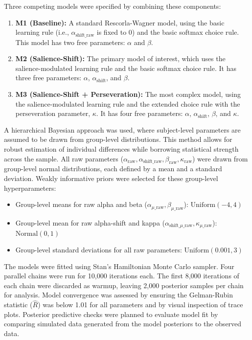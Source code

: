 Three competing models were specified by combining these components:
\begin{enumerate}
    \item \textbf{M1 (Baseline):} A standard Rescorla-Wagner model, using the basic learning rule (i.e., $\alpha_{\text{shift\_raw}}$ is fixed to 0) and the basic softmax choice rule. This model has two free parameters: $\alpha$ and $\beta$.
    \item \textbf{M2 (Salience-Shift):} The primary model of interest, which uses the salience-modulated learning rule and the basic softmax choice rule. It has three free parameters: $\alpha$, $\alpha_{\text{shift}}$, and $\beta$.
    \item \textbf{M3 (Salience-Shift + Perseveration):} The most complex model, using the salience-modulated learning rule and the extended choice rule with the perseveration parameter, $\kappa$. It has four free parameters: $\alpha$, $\alpha_{\text{shift}}$, $\beta$, and $\kappa$.
\end{enumerate}

A hierarchical Bayesian approach was used, where subject-level parameters are assumed to be drawn from group-level distributions. This method allows for robust estimation of individual differences while borrowing statistical strength across the sample. All raw parameters ($\alpha_{\text{raw}}, \alpha_{\text{shift\_raw}}, \beta_{\text{raw}}, \kappa_{\text{raw}}$) were drawn from group-level normal distributions, each defined by a mean and a standard deviation. Weakly informative priors were selected for these group-level hyperparameters:
\begin{itemize}
    \item Group-level means for raw alpha and beta ($\alpha_{\mu\_\text{raw}}, \beta_{\mu\_\text{raw}}$): $\text{Uniform}(-4, 4)$
    \item Group-level mean for raw alpha-shift and kappa ($\alpha_{\text{shift}\_\mu\_\text{raw}}, \kappa_{\mu\_\text{raw}}$): $\text{Normal}(0, 1)$
    \item Group-level standard deviations for all raw parameters: $\text{Uniform}(0.001, 3)$
\end{itemize}

The models were fitted using Stan's Hamiltonian Monte Carlo sampler. Four parallel chains were run for 10,000 iterations each. The first 8,000 iterations of each chain were discarded as warmup, leaving 2,000 posterior samples per chain for analysis. Model convergence was assessed by ensuring the Gelman-Rubin statistic ($\hat{R}$) was below 1.01 for all parameters and by visual inspection of trace plots. Posterior predictive checks were planned to evaluate model fit by comparing simulated data generated from the model posteriors to the observed data.


